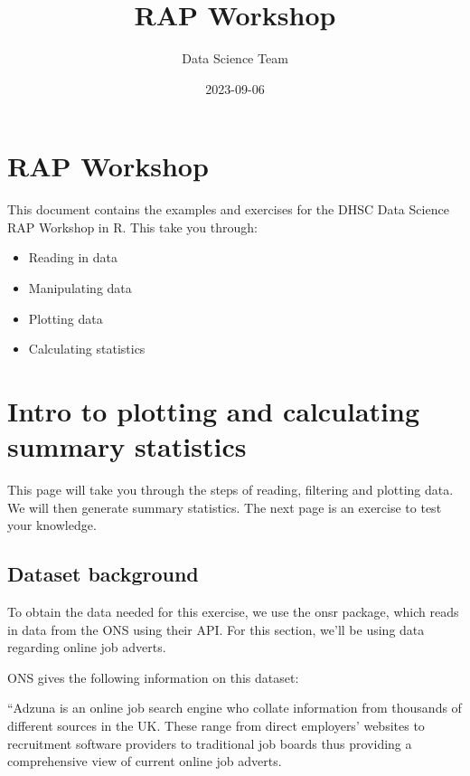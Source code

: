 \documentclass[
]{book}
\title{RAP Workshop}
\author{Data Science Team}
\date{2023-09-06}
\providecommand{\tightlist}{%
  \setlength{\itemsep}{0pt}\setlength{\parskip}{0pt}}
\begin{document}
\maketitle

{
\setcounter{tocdepth}{1}
\tableofcontents
}
\hypertarget{rap-workshop}{%
\chapter{RAP Workshop}\label{rap-workshop}}

This document contains the examples and exercises for the DHSC Data Science RAP Workshop in R. This take you through:

\begin{itemize}
\tightlist
\item
  Reading in data
\item
  Manipulating data
\item
  Plotting data
\item
  Calculating statistics
\end{itemize}

\hypertarget{intro-to-plotting-and-calculating-summary-statistics}{%
\chapter{Intro to plotting and calculating summary statistics}\label{intro-to-plotting-and-calculating-summary-statistics}}

This page will take you through the steps of reading, filtering and plotting data. We will then generate summary statistics. The next page is an exercise to test your knowledge.

\hypertarget{dataset-background}{%
\section{Dataset background}\label{dataset-background}}

To obtain the data needed for this exercise, we use the onsr package, which reads in data from the ONS using their API. For this section, we'll be using data regarding online job adverts.

ONS gives the following information on this dataset:

``Adzuna is an online job search engine who collate information from thousands of different sources in the UK. These range from direct employers' websites to recruitment software providers to traditional job boards thus providing a comprehensive view of current online job adverts.
\end{document}
